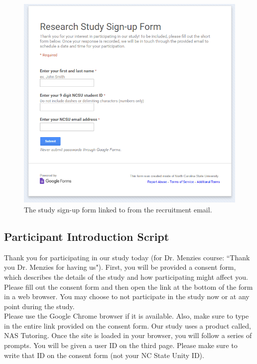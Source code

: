 \documentclass{sig-alternate-05-2015}
\begin{document}
\begin{figure}[!h]
    \centering
    \includegraphics[width=\linewidth]{appendix/signup_form.png}
    \caption{The study sign-up form linked to from the recruitment email.}
\end{figure}

\subsection{Participant Introduction Script}

\noindent Thank you for participating in our study today (for Dr. Menzies course: ``Thank you Dr. Menzies for having us"). First, you will be provided a consent form, which describes the details of the study and how participating might affect you. Please fill out the consent form and then open the link at the bottom of the form in a web browser. You may choose to not participate in the study now or at any point during the study.\\

\noindent Please use the Google Chrome browser if it is available. Also, make sure to type in the entire link provided on the consent form. Our study uses a product called, NAS Tutoring. Once the site is loaded in your browser, you will follow a series of prompts. You will be given a user ID on the third page. Please make sure to write that ID on the consent form (not your NC State Unity ID).\\
\end{document}
